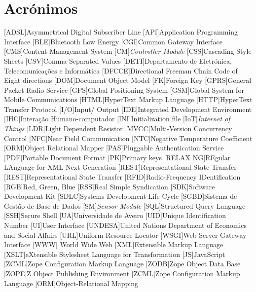 \chapter*{Acrónimos}

\begin{acronym}[RELAX NG]
	
	[ADSL]{Asymmetrical Digital Subscriber Line}
	[API]{Application Programming Interface}
	[BLE]{Bluetooth Low Energy}
	[CGI]{Common Gateway Interface}
	[CMS]{Content Management System}
	[CM]{\textit{Controller Module}}
	[CSS]{Cascading Style Sheets}
	[CSV]{Comma-Separated Values}
	[DETI]{Departamento de Eletrónica, Telecomunicações e Informática}
	[DFCCE]{Directional Freeman Chain Code of Eight directions}
	[DOM]{Document Object Model}
	[FK]{Foreign Key}
	[GPRS]{General Packet Radio Service}
	[GPS]{Global Positioning System}
	[GSM]{Global System for Mobile Communications}
	[HTML]{HyperText Markup Language}
	[HTTP]{HyperText Transfer Protocol}		
	[I/O]{Input/ Output}
	[IDE]{Integrated Development Environment}
	[IHC]{Interação Humano-computador}	
	[INI]{Initialization file}	
	[IoT]{\textit{Internet of Things}}			
	[LDR]{Light Dependent Resistor}
	[MVCC]{Multi-Version Concurrency Control}		
	[NFC]{Near Field Communication}
	[NTC]{Negative Temperature Coefficient}
	[ORM]{Object Relational Mapper}
	[PAS]{Pluggable Authentication Service}
	[PDF]{Portable Document Format}
	[PK]{Primary keys}
	[RELAX NG]{REgular LAnguage for XML Next Generation}
	[REST]{Representational State Transfer}
	[REST]{Representational State Transfer}
	[RFID]{Radio-Frequency IDentification}
	[RGB]{Red, Green, Blue}
	[RSS]{Real Simple Syndication}
	[SDK]{Software Development Kit}
	[SDLC]{Systems Development Life Cycle}
	[SGBD]{Sistema de Gestão de Base de Dados}
	[SM]{\textit{Sensor Module}}
	[SQL]{Structured Query Language}		
	[SSH]{Secure Shell}
	[UA]{Universidade de Aveiro}
	[UID]{Unique Identification Number}
	[UI]{User Interface}
	[UNDESA]{United Nations Department of Economics and Social Affairs}
	[URL]{Uniform Resource Locator}
	[WSGI]{Web Server Gateway Interface}
	[WWW]{ World Wide Web}
	[XML]{Extensible Markup Language}
	[XSLT]{eXtensible Stylesheet Language for Transformation}
	[JS]{JavaScript}	
	[ZCML]{Zope Configuration Markup Language}
	[ZODB]{Zope Object Data Base}
	[ZOPE]{Z Object Publishing Environment}
	[ZCML]{Zope Configuration Markup Language}
	[ORM]{Object-Relational Mapping}
	

\end{acronym}
